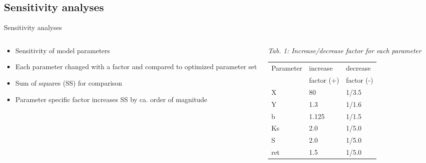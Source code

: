 
\subsection{Sensitivity analyses}
\begin{block}{Sensitivity analyses}
\justifying
\begin{columns}
        \begin{column}{0.25\textwidth}
            \begin{itemize}
                \item Sensitivity of model parameters 
                \item Each parameter changed with a factor and compared to optimized parameter set
                \item Sum of squares (SS) for comparison
                \item Parameter specific factor increases SS by ca. order of magnitude
            \end{itemize}
        \end{column}
    \begin{column}{0.25\textwidth}
            \justifying
            {\it Tab. 1: Increase/decrease factor for each parameter}
        \begin{table}[]
            \small
            \begin{tabular}{lll}
                \hline
                \hline
                Parameter & increase   & decrease \\
                          & factor (+) & factor (-) \\
                \hline
                X         & 80                  & 1/3.5               \\
                Y         & 1.3                 & 1/1.6               \\
                b         & 1.125               & 1/1.5               \\
                Ks        & 2.0                 & 1/5.0               \\
                S         & 2.0                 & 1/5.0               \\
                ret       & 1.5                 & 1/5.0              \\
                \hline
                \hline
            \end{tabular}

\end{table}
\end{column}
\end{columns}
\end{block}
